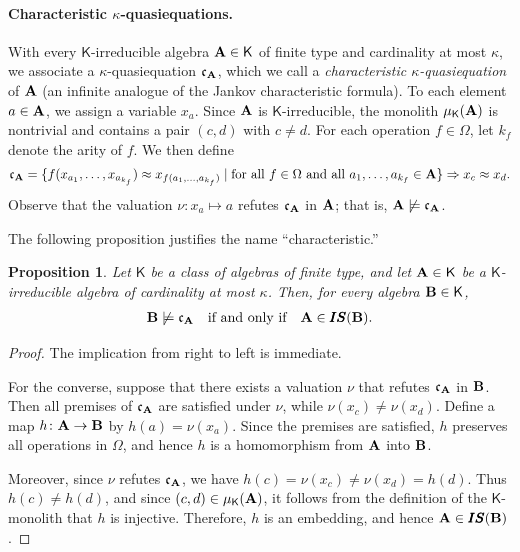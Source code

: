 \documentclass[submission,copyright,creativecommons]{eptcs}
\newtheorem{prop}[theorem]{Proposition}
\theoremstyle{definition}
\newcommand{\alg}[1]{{{\textbf{\upshape #1}}}}
\newcommand{\SU}{\pmb{S}}
\newcommand{\II}{\pmb{I}}
\newcommand{\vv}[1]{\mathsf {#1}}
\newcommand{\Def}[1]{\textit{#1}}
\newcommand{\app}{\approx}
\newcommand{\set}[2]{\{#1 \mid #2\}}
\newcommand{\kk}{\kappa}
\newcommand{\Ra}{\Rightarrow}
\newcommand{\csq}{\mathfrak{c}}
\begin{document}
\paragraph{Characteristic $\kk$-quasiequations.}
With every $\vv K$-irreducible algebra $\alg A \in \vv K$ of finite type and cardinality at most $\kk$, we associate a $\kk$-quasiequation $\csq_\alg A$, which we call a \Def{characteristic $\kk$-quasiequation} of $\alg A$ (an infinite analogue of the Jankov characteristic formula). To each element $a \in \alg A$, we assign a variable $x_a$. Since $\alg A$ is $\vv K$-irreducible, the monolith $\mu_{\vv K}(\alg A)$ is nontrivial and contains a pair $(c,d)$ with $c \neq d$. For each operation $f \in \Omega$, let $k_f$ denote the arity of $f$. We then define
\begin{align*}
	\csq_\alg A =
	\set{f(x_{a_1},\dots,x_{a_{k_f}}) \app x_{f(a_1,\dots,a_{k_f})}}
	{\text{for all } f \in \Omega \text{ and all } a_1,\dots,a_{k_f} \in \alg A}
	\Ra x_c \app x_d.
\end{align*}
Observe that the valuation $\nu \colon x_a \mapsto a$ refutes $\csq_\alg A$ in $\alg A$; that is, $\alg A \not\models \csq_\alg A$.

The following proposition justifies the name “characteristic.”

\begin{prop}\label{pr-char}
	Let $\vv K$ be a class of algebras of finite type, and let $\alg A \in \vv K$ be a $\vv K$-irreducible algebra of cardinality at most $\kk$. Then, for every algebra $\alg B \in \vv K$,
	\begin{align*}
		\alg B \not\models \csq_\alg A
		\quad \text{if and only if} \quad
		\alg A \in \II\SU(\alg B).
	\end{align*}
\end{prop}

\begin{proof}
	The implication from right to left is immediate.
	
	For the converse, suppose that there exists a valuation $\nu$ that refutes $\csq_\alg A$ in $\alg B$. Then all premises of $\csq_\alg A$ are satisfied under $\nu$, while $\nu(x_c) \neq \nu(x_d)$. Define a map $h \colon \alg A \to \alg B$ by $h(a) = \nu(x_a)$. Since the premises are satisfied, $h$ preserves all operations in $\Omega$, and hence $h$ is a homomorphism from $\alg A$ into $\alg B$.
	
	Moreover, since $\nu$ refutes $\csq_\alg A$, we have $h(c) = \nu(x_c) \neq \nu(x_d) = h(d)$. Thus $h(c) \neq h(d)$, and since $(c,d) \in \mu_{\vv K}(\alg A)$, it follows from the definition of the $\vv K$-monolith that $h$ is injective. Therefore, $h$ is an embedding, and hence $\alg A \in \II\SU(\alg B)$.
\end{proof}
\end{document}
